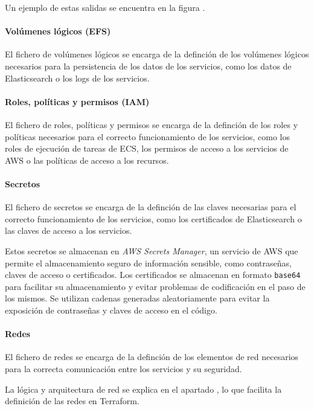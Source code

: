 Un ejemplo de estas salidas se encuentra en la figura
.


\newpage{}
\paragraph{Volúmenes lógicos (EFS)}
El fichero de volúmenes lógicos  se encarga de la
definción de los volúmenes lógicos necesarios para la persistencia de los datos
de los servicios, como los datos de Elasticsearch o los logs de los servicios.


\paragraph{Roles, políticas y permisos (IAM)}
El fichero de roles, políticas y permisos  se encarga
de la definción de los roles y políticas necesarios para el correcto
funcionamiento de los servicios, como los roles de ejecución de tareas de ECS,
los permisos de acceso a los servicios de AWS o las políticas de acceso a los
recursos.


\paragraph{Secretos}
El fichero de secretos  se encarga de la
definción de las claves necesarias para el correcto funcionamiento de los
servicios, como los certificados de Elasticsearch o las claves de acceso a los
servicios.

Estos secretos se almacenan en \textit{AWS Secrets Manager}, un servicio de AWS
que permite el almacenamiento seguro de información sensible, como contraseñas,
claves de acceso o certificados. Los certificados se almacenan en formato
\texttt{base64} para facilitar su almacenamiento y evitar problemas de
codificación en el paso de los mismos. Se utilizan cadenas generadas
aleatoriamente para evitar la exposición de contraseñas y claves de acceso en el
código.


\paragraph{Redes}
El fichero de redes  se encarga de la definción
de los elementos de red necesarios para la correcta comunicación entre los
servicios y su seguridad.

La lógica y arquitectura de red se explica en el apartado
, lo que facilita la definición de las redes en Terraform.


